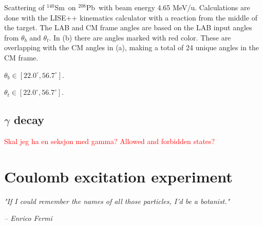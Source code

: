 \documentclass[twoside,english]{uiofysmaster/uiofysmaster}
\newcommand{\Sm}{$^{140}$Sm} %
\newcommand{\Pb}{$^{208}$Pb}
\begin{document}
\begin{table}[htb] 
    \centering 
    \caption{Scattering of \Sm\ on \Pb\ with beam energy 4.65 MeV/u.
    Calculations are done with the LISE++ \cite{LISE} kinematics calculator with a reaction from the middle of the target.
    The LAB and CM frame angles are based on the LAB input angles from $\theta_b$ and $\theta_t$. 
    In (b) there are angles marked with red color. 
    These are overlapping with the CM angles in (a), making a total of 24 unique angles in the CM frame.}
	\label{tab:scattering}
    \begin{subtable}{0.45\textwidth}
    		\centering
		\caption{$\theta_b \in [22.0^\circ, 56.7^\circ]$.}
	 	\label{tab:LABvsCM_b}
	 	
	\end{subtable}
	\begin{subtable}{0.45\textwidth}
		\centering
		\caption{$\theta_t \in [22.0^\circ, 56.7^\circ]$.}
		\label{tab:LABvsCM_t}
		
	\end{subtable}
\end{table}

\newpage

\section{\texorpdfstring{$\gamma$}{Gamma} decay}

\textcolor{red}{Skal jeg ha en seksjon med gamma? Allowed and forbidden states?}


\chapter{Coulomb excitation experiment}
\epigraph{\textit{"If I could remember the names of all those particles, I'd be a botanist."}}{\textit{– Enrico Fermi}}
\end{document}

